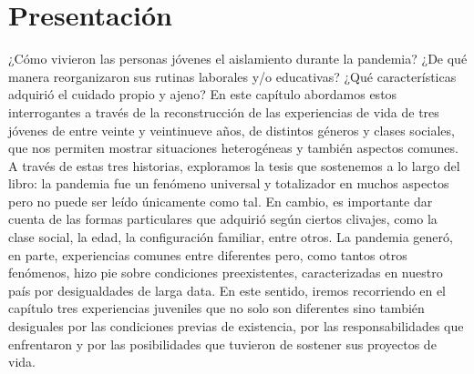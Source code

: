 
\begin{refsection}

\label{cap-27}


\section[Presentación]{Presentación}
\label{cap-27.presentacion}
¿Cómo vivieron las personas jóvenes el aislamiento durante la pandemia? ¿De qué manera reorganizaron sus rutinas laborales y/o educativas? ¿Qué características adquirió el cuidado propio y ajeno? En este capítulo abordamos estos interrogantes a través de la reconstrucción de las experiencias de vida de tres jóvenes de entre veinte y veintinueve años, de distintos géneros y clases sociales, que nos permiten mostrar situaciones heterogéneas y también aspectos comunes. A través de estas tres historias, exploramos la tesis que sostenemos a lo largo del libro: la pandemia fue un fenómeno universal y totalizador en muchos aspectos pero no puede ser leído únicamente como tal. En cambio, es importante dar cuenta de las formas particulares que adquirió según ciertos clivajes, como la clase social, la edad, la configuración familiar, entre otros. La pandemia generó, en parte, experiencias comunes entre diferentes pero, como tantos otros fenómenos, hizo pie sobre condiciones preexistentes, caracterizadas en nuestro país por desigualdades de larga data. En este sentido, iremos recorriendo en el capítulo tres experiencias juveniles que no solo son diferentes sino también desiguales por las condiciones previas de existencia, por las responsabilidades que enfrentaron y por las posibilidades que tuvieron de sostener sus proyectos de vida.


\end{refsection}
